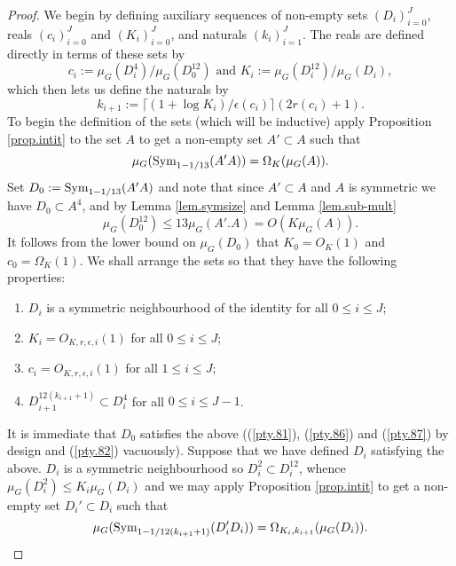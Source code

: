 \documentclass[12pt]{amsart}
\numberwithin{equation}{section}
\theoremstyle{plain}
\theoremstyle{definition}
\renewcommand{\leq}{\leqslant}
\providecommand{\Sym}{\mathop{\rm Sym}\nolimits}
\begin{document}
\begin{proof}
We begin by defining auxiliary sequences of non-empty sets $(D_i)_{i=0}^J$, reals $(c_i)_{i=0}^J$ and $(K_i)_{i=0}^J$, and naturals $(k_i)_{i=1}^J$. The reals are defined directly in terms of these sets by
\begin{equation*}
c_{i}:=\mu_G(D_{i}^4)/\mu_G(D_{0}^{12}) \textrm{ and } K_i:=\mu_G(D_i^{12})/\mu_G(D_i),
\end{equation*}
which then lets us define the naturals by
\begin{equation*}
k_{i+1}:=\lceil(1+ \log K_i)/\epsilon(c_i)\rceil (2r(c_{i})+1).
\end{equation*}
To begin the definition of the sets (which will be inductive) apply Proposition \ref{prop.intit} to the set $A$ to get a non-empty set $A' \subset A$ such that
\begin{equation*}
\mu_G(\Sym_{1-1/13}(A'A))= \Omega_{K}(\mu_G(A)).
\end{equation*}
Set $D_0:=\Sym_{1-1/13}(A'A)$ and note that since $A' \subset A$ and $A$ is symmetric we have $D_0 \subset A^4$, and by Lemma \ref{lem.symsize} and Lemma \ref{lem.sub-mult}
\begin{equation*}
\mu_G(D_0^{12}) \leq 13\mu_G(A'.A) = O(K\mu_G(A)).
\end{equation*}
It follows from the lower bound on $\mu_G(D_0)$ that $K_0 = O_K(1)$ and $c_0=\Omega_K(1)$.  We shall arrange the sets so that they have the following properties:
\begin{enumerate}
\item \label{pty.81} $D_i$ is a symmetric neighbourhood of the identity for all $0 \leq i \leq J$;
\item \label{pty.86} $K_{i} = O_{K,r,\epsilon,i}(1)$ for all $0 \leq i \leq J$;
\item \label{pty.87} $c_i = O_{K,r,\epsilon,i}(1)$ for all $1 \leq i \leq J$;
\item \label{pty.82} $D_{i+1}^{12(k_{i+1}+1)} \subset D_i^4$ for all $0 \leq i \leq J-1$.
\end{enumerate}
It is immediate that $D_0$ satisfies the above ((\ref{pty.81}), (\ref{pty.86}) and (\ref{pty.87}) by design and (\ref{pty.82}) vacuously). Suppose that we have defined $D_i$ satisfying the above.  $D_i$ is a symmetric neighbourhood so $D_i^2 \subset D_i^{12}$, whence $\mu_G(D_i^2) \leq K_i\mu_G(D_i)$ and we may apply Proposition \ref{prop.intit} to get a non-empty set $D_i' \subset D_i$ such that
\begin{equation*}
\mu_G(\Sym_{1-1/12(k_{i+1}+1)}(D_i'D_i)) =\Omega_{K_i,k_{i+1}}(\mu_G(D_i)).

\end{equation*}
\end{proof}
\end{document}
